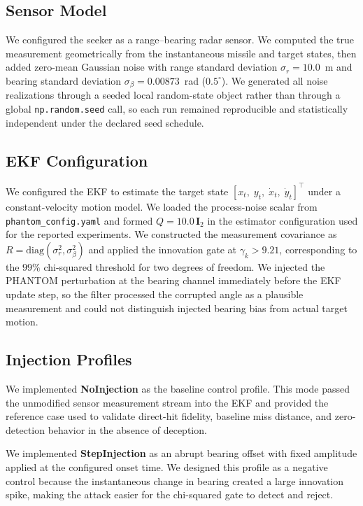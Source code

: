 \documentclass[journal]{IEEEtran}
\begin{document}
\subsection{Sensor Model}
We configured the seeker as a range--bearing radar sensor.  We
computed the true measurement geometrically from the instantaneous
missile and target states, then added zero-mean Gaussian noise with
range standard deviation $\sigma_r = 10.0$~m and bearing standard
deviation $\sigma_\beta = 0.00873$~rad ($0.5^\circ$).  We generated
all noise realizations through a seeded local random-state object
rather than through a global \texttt{np.random.seed} call, so each
run remained reproducible and statistically independent under the
declared seed schedule.

\subsection{EKF Configuration}
We configured the EKF to estimate the target state
$[x_t,\; y_t,\; \dot{x}_t,\; \dot{y}_t]^\top$ under a
constant-velocity motion model.  We loaded the process-noise scalar
from \texttt{phantom\_config.yaml} and formed
$Q = 10.0\,\mathbf{I}_2$ in the estimator configuration used for the
reported experiments.  We constructed the measurement covariance as
$R = \mathrm{diag}(\sigma_r^2,\sigma_\beta^2)$ and applied the
innovation gate at $\gamma_k > 9.21$, corresponding to the
$99\%$ chi-squared threshold for two degrees of freedom.  We injected
the PHANTOM perturbation at the bearing channel immediately before
the EKF update step, so the filter processed the corrupted angle as a
plausible measurement and could not distinguish injected bearing bias
from actual target motion.

\subsection{Injection Profiles}
We implemented \textbf{NoInjection} as the baseline control profile.
This mode passed the unmodified sensor measurement stream into the EKF
and provided the reference case used to validate direct-hit fidelity,
baseline miss distance, and zero-detection behavior in the absence of
deception.

We implemented \textbf{StepInjection} as an abrupt bearing offset with
fixed amplitude applied at the configured onset time.  We designed
this profile as a negative control because the instantaneous change in
bearing created a large innovation spike, making the attack easier for
the chi-squared gate to detect and reject.
\end{document}
